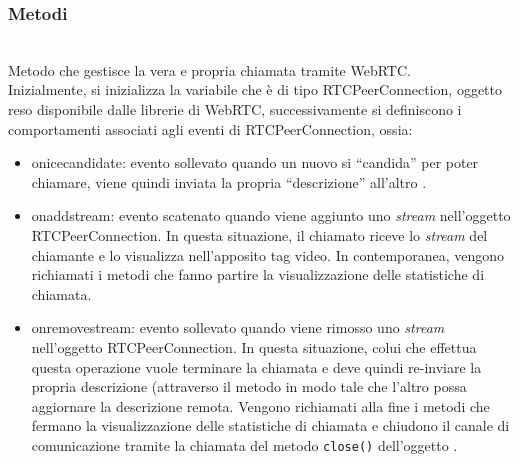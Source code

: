 \subsubsection*{Metodi}
\begin{description}

  \item{}\\
  Metodo che gestisce la vera e propria chiamata tramite WebRTC.\\
Inizialmente, si inizializza la variabile  che è di tipo RTCPeerConnection, oggetto reso disponibile dalle librerie di WebRTC, successivamente si definiscono i comportamenti associati agli eventi di RTCPeerConnection, ossia:
  \begin{itemize}
    \item onicecandidate: evento sollevato quando un nuovo  si ``candida'' per poter chiamare, viene quindi inviata la propria ``descrizione'' all'altro .
    \item onaddstream: evento scatenato quando viene aggiunto uno \textit{stream} nell'oggetto RTCPeerConnection. In questa situazione, il chiamato riceve lo \textit{stream} del chiamante e lo visualizza nell'apposito tag video. In contemporanea, vengono richiamati i metodi che fanno partire la visualizzazione delle statistiche di chiamata.
    \item onremovestream: evento sollevato quando viene rimosso uno \textit{stream} nell'oggetto RTCPeerConnection. In questa situazione, colui che effettua questa operazione vuole terminare la chiamata e deve quindi re-inviare la propria descrizione (attraverso il metodo  in modo tale che l'altro  possa aggiornare la descrizione remota. Vengono richiamati alla fine i metodi che fermano la visualizzazione delle statistiche di chiamata e chiudono il canale di comunicazione tramite la chiamata del metodo \verb'close()' dell'oggetto .
  \end{itemize}


\end{description}
